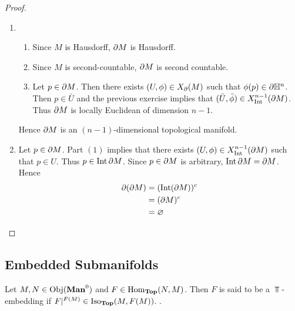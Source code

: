 \documentclass{book}
\begin{document}
\begin{proof}\
	\begin{enumerate}
		\item 
		\begin{enumerate}
			\item Since $M$ is Hausdorff, $\partial M$ is Hausdorff.
			\item Since $M$ is second-countable, $\partial M$ is second countable. 
			\item Let $p \in \partial M$. Then there exists $(U, \phi) \in X_{\partial}(M)$ such that $\phi(p) \in \partial \mathbb{H}^n$. Then $p \in \bar{U}$ and the previous exercise implies that $(\bar{U}, \bar{\phi}) \in X^{n-1}_{\operatorname{Int}}(\partial M)$. Thus $\partial M$ is locally Euclidean of dimension $n-1$.
		\end{enumerate}
		Hence $\partial M$ is an $(n-1)$-dimensional topological manifold.
		\item Let $p \in \partial M$. Part $(1)$ implies that there exists $(U, \phi) \in X^{n-1}_{\operatorname{Int}}(\partial M)$ such that $p \in U$. Thus $p \in \operatorname{Int} \partial M$. Since $p \in \partial M$ is arbitrary, $\operatorname{Int} \partial M = \partial M$. Hence 
		\begin{align*}
			\partial (\partial M)
			& = (\operatorname{Int}(\partial M))^c \\
			& = (\partial M)^c \\
			& = \varnothing
		\end{align*} 
	\end{enumerate}
\end{proof}








































\subsection{Embedded Submanifolds}

\begin{defn} 
	Let $M, N \in \Obj(\Man0)$ and $F \in \operatorname{Hom}_{\operatorname*{\text{\textbf{Top}}}}(N, M)$. Then $F$ is said to be a $\Top$-embedding if $F|^{F(M)} \in \operatorname{Iso}_{\operatorname*{\text{\textbf{Top}}}}(M,F(M))$.  .
\end{defn}
\end{document}
